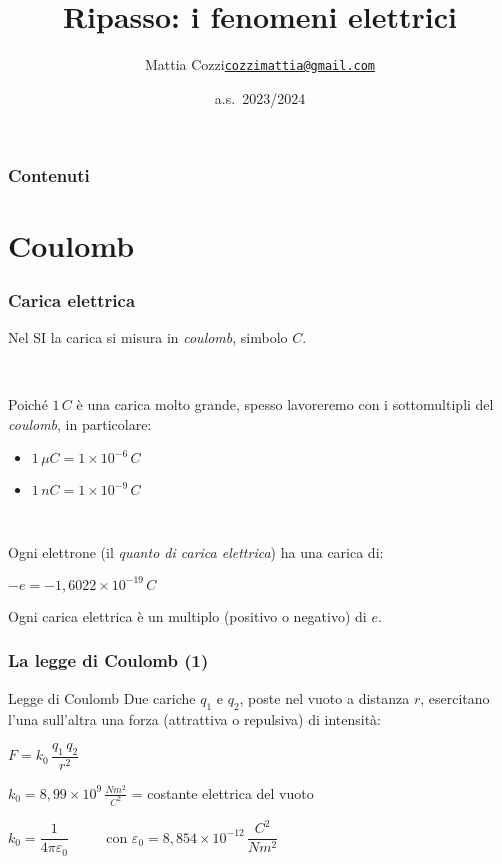 \documentclass[handout]{beamer}
\title{Ripasso: i fenomeni elettrici}
\author{\texorpdfstring{Mattia Cozzi\newline\href{mailto:cozzimattia@gmail.com}{\texttt{cozzimattia@gmail.com}}}{Mattia Cozzi}}
\date{a.s.~2023/2024}
\theoremstyle{plain}
\begin{document}
\begin{frame}
  \titlepage
\end{frame}





\begin{frame}
\frametitle{Contenuti}
\tableofcontents
\end{frame}




\section{Coulomb}

\begin{frame}
\frametitle{Carica elettrica}
Nel SI \alert<1>{la carica si misura in \emph{coulomb}}, simbolo $ C $.\pause

~

Poiché $ 1 \, C $ è una carica molto grande, spesso lavoreremo con i sottomultipli del \emph{coulomb}, in particolare:
\begin{itemize}
  \item $ 1 \, \mu C = 1 \times 10^{-6} \, C $
  \item $ 1 \, n C = 1 \times 10^{-9} \, C $
\end{itemize}\pause

~

Ogni elettrone (il \emph{quanto di carica elettrica}) ha una carica di:
\begin{center}
\colorbox{blue!30}{$ -e = - 1,6022 \times 10^{-19} \, C $}
\end{center}

Ogni carica elettrica è un multiplo (positivo o negativo) di $ e $.
\end{frame}


\begin{frame}
\frametitle{La legge di Coulomb (1)}
\begin{block}{Legge di Coulomb}
Due cariche $ q_1 $ e $ q_2 $, poste nel vuoto a distanza $ r $, esercitano l'una sull'altra una forza (attrattiva o repulsiva) di intensità:
\begin{center}
\colorbox{blue!30}{$ F = k_0 \,  \dfrac{q_1 \, q_2}{r^2} $}
\end{center}
$ k_0 = 8,99 \times 10^9 \, \frac{Nm^2}{C^2}$ =  costante elettrica del vuoto
\end{block}\pause
\begin{center}
$ k_0 = \dfrac{1}{4 \pi \varepsilon_0} $ ~~~~ con \colorbox{blue!30}{$ \varepsilon_0 = 8,854 \times 10^{-12} \,  \dfrac{C^2}{Nm^2} $}
\end{center}
\end{frame}
\end{document}
